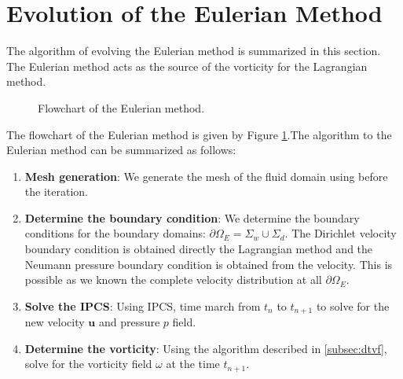 
\section{Evolution of the Eulerian Method}
\label{sec:eu-eotem}
The algorithm of evolving the Eulerian method is summarized in this section. The Eulerian method acts as the source of the vorticity for the Lagrangian method.

	\begin{figure}[!h]
		\centering
		\caption{Flowchart of the Eulerian method.}
		\label{fig:flowchart_eulerian}
	\end{figure}	
	
The flowchart of the Eulerian method is given by Figure \ref{fig:flowchart_eulerian}.The algorithm to the Eulerian method can be summarized as follows:
	\begin{enumerate}
	\item \textbf{Mesh generation}: We generate the mesh of the fluid domain using \gmsh before the iteration.
	\item \textbf{Determine the boundary condition}: We determine the boundary conditions for the boundary domains: $\partial \Omega_E = \Sigma_{w} \cup \Sigma_{d}$. The Dirichlet velocity boundary condition is obtained directly the Lagrangian method and the Neumann pressure boundary condition is obtained from the velocity. This is possible as we known the complete velocity distribution at all $\partial \Omega_E$. 
	
	\item \textbf{Solve the IPCS}: Using IPCS, time march from $t_n$ to $t_{n+1}$ to solve for the new velocity $\mathbf{u}$ and pressure $p$ field.
	\item \textbf{Determine the vorticity}: Using the algorithm described in \ref{subsec:dtvf}, solve for the vorticity field $\omega$ at the time $t_{n+1}$. 
	\end{enumerate}
	
